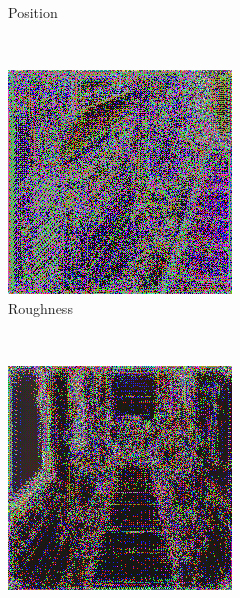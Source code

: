 \begin{figure}[h!]
\begin{subfigure}[b]{0.175\textwidth}
     \caption{Position}\label{subfig:1}
    \end{subfigure}
    ~
    \begin{subfigure}[b]{0.175\textwidth}
     \includegraphics[width=\textwidth]{figures/result/triple/depth_albedo_roughness/1.png}
     \caption{Roughness}
    \end{subfigure}
    \\ \vspace{0.2cm} %
    \begin{subfigure}[b]{0.175\textwidth}
     \includegraphics[width=\textwidth]{figures/result/triple/depth_albedo_emissive/2.png}

\end{subfigure}
\end{figure}
